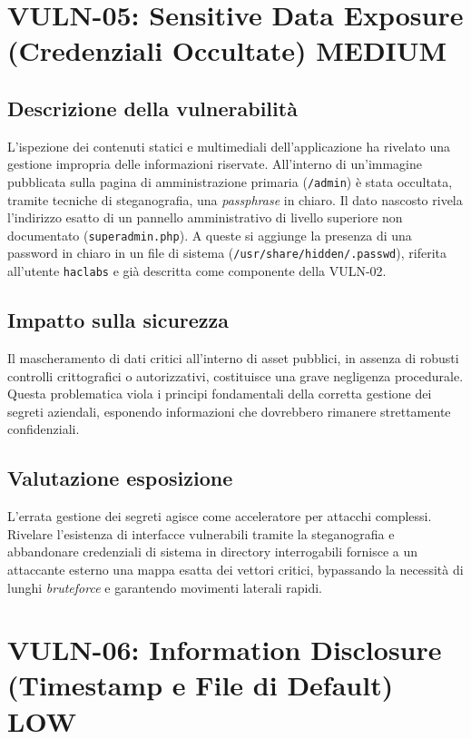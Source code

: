 \documentclass[11pt]{report}
\newcommand{\sevMED}{\textcolor{sevMedio}{\textbf{MEDIUM}}}
\newcommand{\sevLOW}{\textcolor{sevBasso}{\textbf{LOW}}}
\begin{document}
	\section[Sensitive Data Exposure]{VULN-05: Sensitive Data Exposure (Credenziali Occultate) \hfill \sevMED}
	\subsection{Descrizione della vulnerabilità}
	L'ispezione dei contenuti statici e multimediali dell'applicazione ha rivelato una gestione impropria delle informazioni riservate. All'interno di un'immagine pubblicata sulla pagina di amministrazione primaria (\texttt{/admin}) è stata occultata, tramite tecniche di steganografia, una \textit{passphrase} in chiaro. Il dato nascosto rivela l'indirizzo esatto di un pannello amministrativo di livello superiore non documentato (\texttt{superadmin.php}). A queste si aggiunge la presenza di una password in chiaro in un file di sistema (\texttt{/usr/share/hidden/.passwd}), riferita all'utente \texttt{haclabs} e già descritta come componente della VULN-02.
	
	\subsection{Impatto sulla sicurezza}
	Il mascheramento di dati critici all'interno di asset pubblici, in assenza di robusti controlli crittografici o autorizzativi, costituisce una grave negligenza procedurale. Questa problematica viola i principi fondamentali della corretta gestione dei segreti aziendali, esponendo informazioni che dovrebbero rimanere strettamente confidenziali.
	
	\subsection{Valutazione esposizione}
	L'errata gestione dei segreti agisce come acceleratore per attacchi complessi. Rivelare l'esistenza di interfacce vulnerabili tramite la steganografia e abbandonare credenziali di sistema in directory interrogabili fornisce a un attaccante esterno una mappa esatta dei vettori critici, bypassando la necessità di lunghi \textit{bruteforce} e garantendo movimenti laterali rapidi.
	
	\section[Information Disclosure]{VULN-06: Information Disclosure (Timestamp e File di Default) \hfill \sevLOW}
\end{document}
